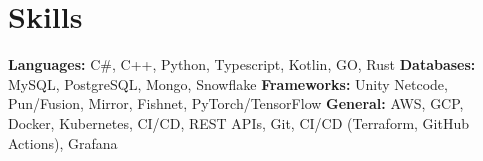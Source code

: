 \vspace{5 pt - 0.3 cm}
\section{Skills}
\begin{onecolentry}
    \textbf{Languages:} C\#, C++, Python, Typescript, Kotlin, GO, Rust \newline
    \textbf{Databases:} MySQL, PostgreSQL, Mongo, Snowflake \newline
    \textbf{Frameworks:} Unity Netcode, Pun/Fusion, Mirror, Fishnet, PyTorch/TensorFlow  \newline
    \textbf{General:} AWS, GCP, Docker, Kubernetes, CI/CD, REST APIs, Git, CI/CD (Terraform, GitHub Actions), Grafana \newline
\end{onecolentry}
